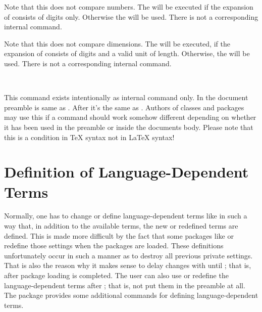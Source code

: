 \begin{Declaration}
\end{Declaration}
%
Note that this does not compare numbers.  The  will
be executed if the expansion of  consists of digits
only. Otherwise the  will be used. There is not a
corresponding internal command.
%
%


\begin{Declaration}
\end{Declaration}
%
Note that this does not compare dimensions. The  will
be executed, if the expansion of  consists of digits and a valid
unit of length. Otherwise, the  will be used. There
is not a corresponding internal command.
%
%


\begin{Declaration}
  \  
  \  
\end{Declaration}
%
This command exists intentionally as internal command only. In the document
preamble  is same as . After
 it's the same as . Authors of
classes and packages may use this if a command should work somehow different
depending on whether it has been used in the preamble or inside the documents
body. Please note that this is a condition in \TeX{}
syntax not in \LaTeX{} syntax!
%
%


\section{Definition of Language-Dependent Terms}
\label{sec:scrbase.languageSupport}

Normally, one has to change or define language-dependent terms like
 in such a way that, in addition to the available terms,
the new or redefined terms are defined. This is made more difficult by the
fact that some packages like  or
 redefine those settings when the
packages are loaded. These definitions unfortunately occur in such a manner as
to destroy all previous private settings. That is also the reason why it makes
sense to delay changes with  until
; that is, after package loading is
completed. The user can also use  or redefine the
language-dependent terms after ; that is,
not put them in the preamble at all. The package 
provides some additional commands for defining language-dependent terms.


